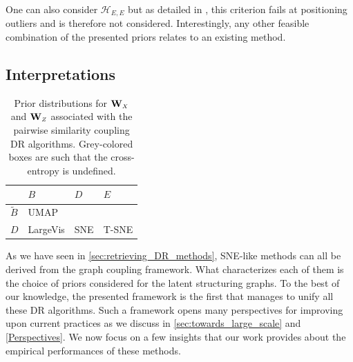 \begin{remark}
One can also consider $\mathcal{H}_{E,E}$ but as detailed in \cite{maaten2008tSNE}, this criterion fails at positioning outliers and is therefore not considered. 
Interestingly, any other feasible combination of the presented priors relates to an existing method.
\end{remark}

\subsection{Interpretations}\label{sec:interpretations}

\begin{table}[]
    \caption{Prior distributions for $\Wb_{\scaleto{X}{4pt}}$ and $\Wb_{\scaleto{Z}{4pt}}$ associated with the pairwise similarity coupling DR algorithms. Grey-colored boxes are such that the cross-entropy is undefined.}
    \begin{center}
    \begin{small}
    \begin{sc}
    \centering
    \renewcommand{\arraystretch}{2}
    \begin{NiceTabular}{|W{c}{1cm}|W{c}{1.8cm}|W{c}{1.8cm}|W{c}{1.8cm}|}
    \hline
     & $B$ & $D$ & $E$ \\
    \hline
    $\widetilde{B}$ & UMAP &  &  \\
    \hline
    $D$ & LargeVis & SNE & T-SNE\\
    \hline
    \end{NiceTabular}
    \label{tableau_priors}
    \end{sc}
    \end{small}
    \end{center}
    \label{priors_methods}
\end{table}

As we have seen in \cref{sec:retrieving_DR_methods}, SNE-like methods can all be derived from the graph coupling framework.  What characterizes each of them is the choice of priors considered for the latent structuring graphs. To the best of our knowledge, the presented framework is the first that manages to unify all these DR algorithms. Such a framework opens many perspectives for improving upon current practices as we discuss in \cref{sec:towards_large_scale} and \cref{Perspectives}. 
We now focus on a few insights that our work provides about the empirical performances of these methods. 

